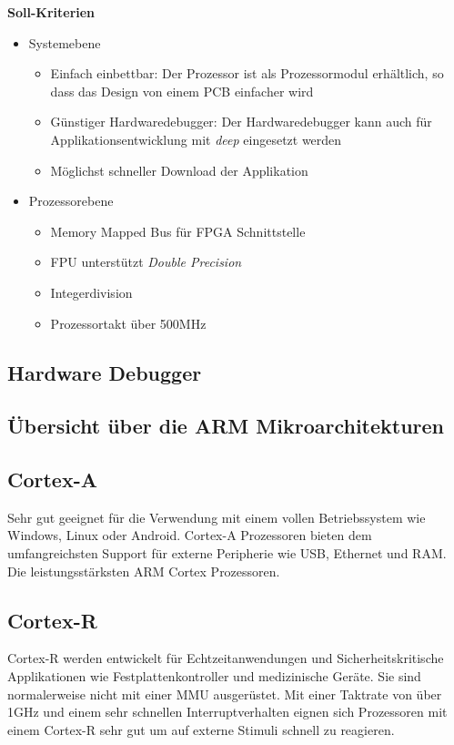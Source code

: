 \textbf{Soll-Kriterien}
\begin{itemize}
\item Systemebene
	\begin{itemize}
	\item Einfach einbettbar: Der Prozessor ist als Prozessormodul erhältlich, so dass das Design von einem PCB einfacher wird
	\item Günstiger Hardwaredebugger: Der Hardwaredebugger kann auch für Applikationsentwicklung mit \textit{deep} eingesetzt werden
	\item Möglichst schneller Download der Applikation
	\end{itemize}
\item Prozessorebene
	\begin{itemize}
	\item Memory Mapped Bus für FPGA Schnittstelle
	\item FPU unterstützt \textit{Double Precision}
	\item Integerdivision
	\item Prozessortakt über 500MHz
	\end{itemize}
\end{itemize}


\subsection{Hardware Debugger}



\subsection{Übersicht über die ARM Mikroarchitekturen}
\subsection{Cortex-A}
Sehr gut geeignet für die Verwendung mit einem vollen Betriebssystem wie Windows, Linux oder Android.
Cortex-A Prozessoren bieten dem umfangreichsten Support für externe Peripherie wie USB, Ethernet und RAM.
Die leistungsstärksten ARM Cortex Prozessoren.

\subsection{Cortex-R}
Cortex-R werden entwickelt für Echtzeitanwendungen und Sicherheitskritische Applikationen wie Festplattenkontroller und medizinische Geräte.
Sie sind normalerweise nicht mit einer MMU ausgerüstet.
Mit einer Taktrate von über 1GHz und einem sehr schnellen Interruptverhalten eignen sich Prozessoren mit einem Cortex-R sehr gut um auf externe Stimuli schnell zu reagieren.

